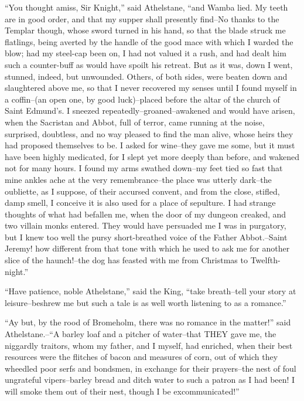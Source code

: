 ``You thought amiss, Sir Knight,'' said Athelstane, ``and Wamba lied. My
teeth are in good order, and that my supper shall presently find--No
thanks to the Templar though, whose sword turned in his hand, so that
the blade struck me flatlings, being averted by the handle of the good
mace with which I warded the blow; had my steel-cap been on, I had not
valued it a rush, and had dealt him such a counter-buff as would have
spoilt his retreat. But as it was, down I went, stunned, indeed, but
unwounded. Others, of both sides, were beaten down and slaughtered above
me, so that I never recovered my senses until I found myself in a
coffin--(an open one, by good luck)--placed before the altar of the
church of Saint Edmund's. I sneezed repeatedly--groaned--awakened and
would have arisen, when the Sacristan and Abbot, full of terror, came
running at the noise, surprised, doubtless, and no way pleased to find
the man alive, whose heirs they had proposed themselves to be. I asked
for wine--they gave me some, but it must have been highly medicated, for
I slept yet more deeply than before, and wakened not for many hours. I
found my arms swathed down--my feet tied so fast that mine ankles ache
at the very remembrance--the place was utterly dark--the oubliette, as I
suppose, of their accursed convent, and from the close, stifled, damp
smell, I conceive it is also used for a place of sepulture. I had
strange thoughts of what had befallen me, when the door of my dungeon
creaked, and two villain monks entered. They would have persuaded me I
was in purgatory, but I knew too well the pursy short-breathed voice of
the Father Abbot.--Saint Jeremy! how different from that tone with which
he used to ask me for another slice of the haunch!--the dog has feasted
with me from Christmas to Twelfth-night.''

``Have patience, noble Athelstane,'' said the King, ``take breath--tell
your story at leisure--beshrew me but such a tale is as well worth
listening to as a romance.''

``Ay but, by the rood of Bromeholm, there was no romance in the
matter!'' said Athelstane.--``A barley loaf and a pitcher of water--that
THEY gave me, the niggardly traitors, whom my father, and I myself, had
enriched, when their best resources were the flitches of bacon and
measures of corn, out of which they wheedled poor serfs and bondsmen, in
exchange for their prayers--the nest of foul ungrateful vipers--barley
bread and ditch water to such a patron as I had been! I will smoke them
out of their nest, though I be excommunicated!''

